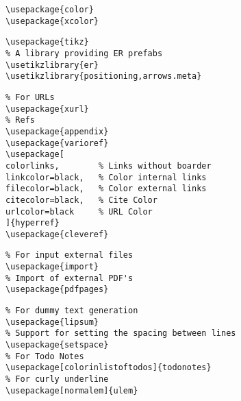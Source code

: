 \begin{lstlisting}[language={[LaTeX]TeX}, label=lst:Colors, basicstyle=\footnotesize]
%% For Colors (\textcolor etc.)
\usepackage{color}
\usepackage{xcolor}
\end{lstlisting}


\begin{lstlisting}[language={[LaTeX]TeX}, label=lst:Tikz, basicstyle=\footnotesize]
%% For Tikz
\usepackage{tikz}
% A library providing ER prefabs
\usetikzlibrary{er}
\usetikzlibrary{positioning,arrows.meta}
\end{lstlisting}

\begin{lstlisting}[language={[LaTeX]TeX}, label=lst:References, basicstyle=\footnotesize]
%% References
% For URLs
\usepackage{xurl}
% Refs
\usepackage{appendix}
\usepackage{varioref}
\usepackage[
colorlinks,        % Links without boarder
linkcolor=black,   % Color internal links
filecolor=black,   % Color external links
citecolor=black,   % Cite Color
urlcolor=black	   % URL Color
]{hyperref}
\usepackage{cleveref}
\end{lstlisting}

\begin{lstlisting}[language={[LaTeX]TeX}, label=lst:Import, basicstyle=\footnotesize]
%% Import
% For input external files
\usepackage{import}
% Import of external PDF's
\usepackage{pdfpages}
\end{lstlisting}


\begin{lstlisting}[language={[LaTeX]TeX}, label=lst:Tools, basicstyle=\footnotesize]
%% Further tools and styles
% For dummy text generation
\usepackage{lipsum}
% Support for setting the spacing between lines
\usepackage{setspace}
% For Todo Notes 
\usepackage[colorinlistoftodos]{todonotes}
% For curly underline
\usepackage[normalem]{ulem}
\end{lstlisting}





\pagebreak
